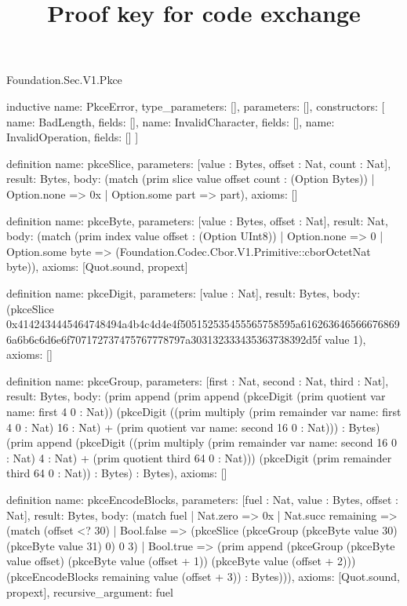\begin{lexlean}{Foundation.Sec.V1.Pkce}
\title{Proof key for code exchange}
\begin{semanticmodule}
inductive{
  name: PkceError,
  type_parameters: [],
  parameters: [],
  constructors: [
    {name: BadLength, fields: []},
    {name: InvalidCharacter, fields: []},
    {name: InvalidOperation, fields: []}
  ]
}

definition{
  name: pkceSlice,
  parameters: [value : Bytes, offset : Nat, count : Nat],
  result: Bytes,
  body: (match (prim slice value offset count : (Option Bytes))
    | Option.none => 0x
    | Option.some part => part),
  axioms: []
}

definition{
  name: pkceByte,
  parameters: [value : Bytes, offset : Nat],
  result: Nat,
  body: (match (prim index value offset : (Option UInt8))
    | Option.none => 0
    | Option.some byte => (Foundation.Codec.Cbor.V1.Primitive::cborOctetNat byte)),
  axioms: [Quot.sound, propext]
}

definition{
  name: pkceDigit,
  parameters: [value : Nat],
  result: Bytes,
  body: (pkceSlice 0x4142434445464748494a4b4c4d4e4f505152535455565758595a6162636465666768696a6b6c6d6e6f707172737475767778797a303132333435363738392d5f value 1),
  axioms: []
}

definition{
  name: pkceGroup,
  parameters: [first : Nat, second : Nat, third : Nat],
  result: Bytes,
  body: (prim append (prim append (pkceDigit (prim quotient var{
    name: first
  } 4 0 : Nat)) (pkceDigit ((prim multiply (prim remainder var{
    name: first
  } 4 0 : Nat) 16 : Nat) + (prim quotient var{
    name: second
  } 16 0 : Nat))) : Bytes) (prim append (pkceDigit ((prim multiply (prim remainder var{
    name: second
  } 16 0 : Nat) 4 : Nat) + (prim quotient third 64 0 : Nat))) (pkceDigit (prim remainder third 64 0 : Nat)) : Bytes) : Bytes),
  axioms: []
}

definition{
  name: pkceEncodeBlocks,
  parameters: [fuel : Nat, value : Bytes, offset : Nat],
  result: Bytes,
  body: (match fuel
    | Nat.zero => 0x
    | Nat.succ remaining => (match (offset <? 30)
      | Bool.false => (pkceSlice (pkceGroup (pkceByte value 30) (pkceByte value 31) 0) 0 3)
      | Bool.true => (prim append (pkceGroup (pkceByte value offset) (pkceByte value (offset + 1)) (pkceByte value (offset + 2))) (pkceEncodeBlocks remaining value (offset + 3)) : Bytes))),
  axioms: [Quot.sound, propext],
  recursive_argument: fuel
}


\end{semanticmodule}
\end{lexlean}
